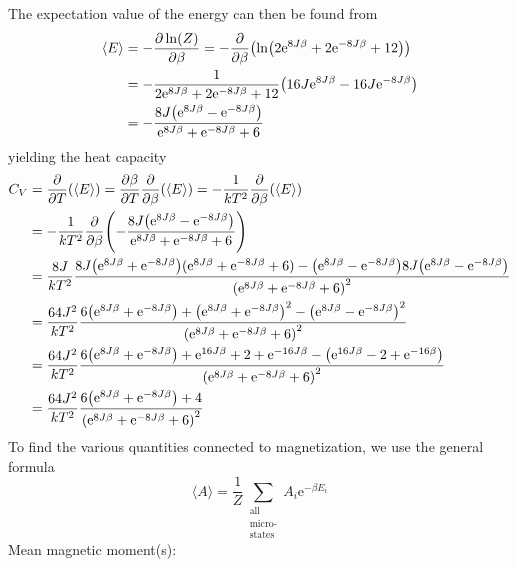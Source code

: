 \documentclass[12pt,english,a4paper]{article}
\renewcommand{\exp}[1]{\mathrm{e}^{#1}}
\begin{document}
The expectation value of the energy can then be found from
\begin{alignat*}{2}
    \langle E\rangle &= -\pdv{\ln(Z)}{\beta} = -\pdv{\beta}(\ln(2\exp{8J\beta} + 2\exp{-8J\beta} + 12))\\
    &= -\frac{1}{2\exp{8J\beta} + 2\exp{-8J\beta} + 12}\qty(16J\exp{8J\beta}-16J\exp{-8J\beta})\\
    &= -\frac{8J\qty(\exp{8J\beta}-\exp{-8J\beta})}{\exp{8J\beta}+\exp{-8J\beta}+6}
\end{alignat*}
yielding the heat capacity
\begin{alignat*}{2}
    C_V &= \pdv{T}(\langle E\rangle) = \pdv{\beta}{T}\pdv{\beta}(\langle E\rangle)=-\frac{1}{kT^2}\pdv{\beta}(\langle E\rangle)\\
    &= -\frac{1}{kT^2}\pdv{\beta}(-\frac{8J\qty(\exp{8J\beta}-\exp{-8J\beta})}{\exp{8J\beta}+\exp{-8J\beta}+6})\\
    &= \frac{8J}{kT^2}\frac{8J\qty(\exp{8J\beta}+\exp{-8J\beta})(\exp{8J\beta}+\exp{-8J\beta}+6)-\qty(\exp{8J\beta}-\exp{-8J\beta})8J\qty(\exp{8J\beta}-\exp{-8J\beta})}{\qty(\exp{8J\beta}+\exp{-8J\beta}+6)^2}\\
    &= \frac{64J^2}{kT^2}\frac{6\qty(\exp{8J\beta}+\exp{-8J\beta})+\qty(\exp{8J\beta}+\exp{-8J\beta})^2-\qty(\exp{8J\beta}-\exp{-8J\beta})^2}{\qty(\exp{8J\beta}+\exp{-8J\beta}+6)^2}\\
    &= \frac{64J^2}{kT^2}\frac{6\qty(\exp{8J\beta}+\exp{-8J\beta})+\exp{16J\beta}+2+\exp{-16J\beta}-\qty(\exp{16J\beta}-2+\exp{-16\beta})}{\qty(\exp{8J\beta}+\exp{-8J\beta}+6)^2}\\
    &= \frac{64J^2}{kT^2}\frac{6\qty(\exp{8J\beta}+\exp{-8J\beta})+4}{\qty(\exp{8J\beta}+\exp{-8J\beta}+6)^2}
\end{alignat*}
To find the various quantities connected to magnetization, we use the general formula
\[
    \langle A\rangle = \frac{1}{Z}\sum_{\substack{\text{all}\\ \text{micro-}\\ \text{states}}}A_i\exp{-\beta E_i}
\]
Mean magnetic moment(s):
\end{document}
